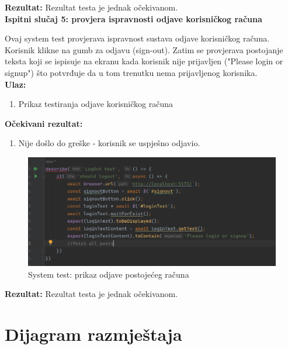 			
			\textbf{Rezultat:}
			Rezultat testa je jednak očekivanom.\\
			
			\textbf{Ispitni slučaj 5: provjera ispravnosti odjave korisničkog računa}
			
			Ovaj system test provjerava ispravnost sustava odjave korisničkog računa. Korisnik klikne na gumb za odjavu (sign-out). Zatim se provjerava postojanje teksta koji se ispisuje na ekranu kada korisnik nije prijavljen ("Please login or signup") što potvrđuje da u tom trenutku nema prijavljenog korisnika. \\
			
			\textbf{Ulaz:}
			
				\begin{enumerate}
					\item Prikaz testiranja odjave korisničkog računa
				\end{enumerate}
				
			\textbf{Očekivani rezultat:}
			
				\begin{enumerate}
					\item Nije došlo do greške - korisnik se uspješno odjavio.
				\end{enumerate}
			
			\begin{figure}[H]
				\includegraphics[scale=0.7]{slike/syslogout.PNG} 
				\centering
				\caption{System test: prikaz odjave postojećeg računa}
				\label{syslogout}
			\end{figure}
			
			
			\textbf{Rezultat:}
			Rezultat testa je jednak očekivanom.\\
			
			\eject 
		
		
		\section{Dijagram razmještaja}
			
